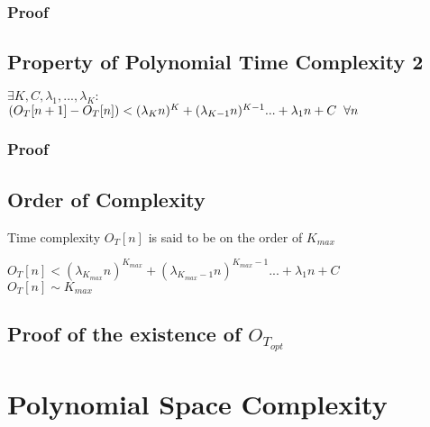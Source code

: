 \documentclass[11pt]{article}
\begin{document}
\subsubsection{Proof}


\subsection{Property of Polynomial Time Complexity 2}
\begin{center}
$
\exists K,C,\lambda_1,...,\lambda_K :
$
\\ \vspace{2mm}
$
(O_T[n+1] - O_T[n]) <  (\lambda_K n)^K + (\lambda_{K-1} n)^{K-1}... + \lambda_1 n + C \hspace{2mm} \forall n
$
\end{center}
\subsubsection{Proof}




\subsection{Order of Complexity}
Time complexity $O_T[n]$ is said to be on the order of $K_{max}$
\begin{center}
$
O_T[n] < (\lambda_{K_{max}} n)^{K_{max}} + (\lambda_{K_{max}-1} n)^{K_{max}-1}... + \lambda_1 n + C
$
\\ \vspace{2mm}
$
O_T[n] \sim K_{max}
$
\end{center}


\subsection{Proof of the existence of $O_{T_{opt}}$}
















\newpage
\section{Polynomial Space Complexity}


\end{document}
